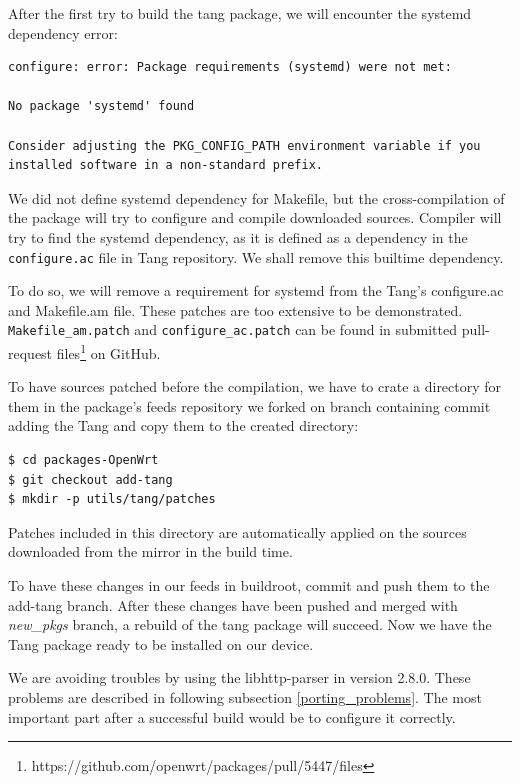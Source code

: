 After the first try to build the tang package, we will encounter the systemd dependency error:
\begin{lstlisting}[columns=fixed,basicstyle=\ttfamily\footnotesize,tabsize=4,backgroundcolor=\color{yellow!10}]
configure: error: Package requirements (systemd) were not met:

No package 'systemd' found

Consider adjusting the PKG_CONFIG_PATH environment variable if you
installed software in a non-standard prefix.
\end{lstlisting}
We did not define systemd dependency for Makefile, but the cross-compilation of the package will try to configure and compile downloaded sources.
Compiler will try to find the systemd dependency, as it is defined as a dependency in the {\tt configure.ac} file in Tang repository.
We shall remove this builtime dependency.

To do so, we will remove a requirement for systemd from the Tang's configure.ac and Makefile.am file.
These patches are too extensive to be demonstrated.
{\tt Makefile\_am.patch} and {\tt configure\_ac.patch} can be found in submitted pull-request files\footnote{https://github.com/openwrt/packages/pull/5447/files} on GitHub.

To have sources patched before the compilation, we have to crate a directory for them in the package's feeds repository we forked on branch containing commit adding the Tang and copy them to the created directory:
\begin{lstlisting}[columns=fixed,basicstyle=\ttfamily\footnotesize,tabsize=4,backgroundcolor=\color{yellow!10}]
$ cd packages-OpenWrt
$ git checkout add-tang
$ mkdir -p utils/tang/patches
\end{lstlisting}
Patches included in this directory are automatically applied on the sources downloaded from the mirror in the build time.

To have these changes in our feeds in buildroot, commit and push them to the add-tang branch.
After these changes have been pushed and merged with {\it new\_pkgs} branch, a rebuild of the tang package will succeed.
Now we have the Tang package ready to be installed on our device.

We are avoiding troubles by using the libhttp-parser in version 2.8.0.
These problems are described in following subsection \ref{porting_problems}.
The most important part after a successful build would be to configure it correctly.



